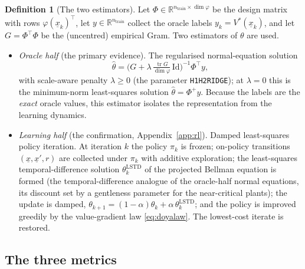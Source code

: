 \documentclass[11pt]{article}
\renewcommand{\_}{\discretionary{\textunderscore}{}{\textunderscore}}
\theoremstyle{plain}
\theoremstyle{definition}
\newtheorem{definition}[theorem]{Definition}
\newcommand{\R}{\mathbb{R}}
\newcommand{\tr}{\operatorname{tr}}
\begin{document}
\begin{definition}[The two estimators]\label{def:estimator}
Let $\Phi\in\R^{n_{\text{train}}\times\dim\varphi}$ be the design matrix with rows
$\varphi(\underline x_{k})^{\top}$, let $y\in\R^{n_{\text{train}}}$ collect the oracle labels
$y_{k}=V^{\ast}(\underline x_{k})$, and let $G=\Phi^{\top}\Phi$ be the (uncentred) empirical Gram. Two
estimators of $\theta$ are used.
\begin{itemize}
\item \emph{Oracle half} (the primary evidence). The regularised normal-equation solution
\[
\hat\theta=\Big(G+\lambda\,\tfrac{\tr G}{\dim\varphi}\,\mathrm{Id}\Big)^{-1}\Phi^{\top}y,
\]
with scale-aware penalty $\lambda\ge0$ (the parameter \texttt{H1H2\_RIDGE}); at $\lambda=0$ this is
the minimum-norm least-squares solution $\hat\theta=\Phi^{+}y$. Because the labels are the
\emph{exact} oracle values, this estimator isolates the representation from the learning dynamics.
\item \emph{Learning half} (the confirmation, Appendix~\ref{app:rl}). Damped least-squares policy
iteration. At iteration $k$ the policy $\pi_{k}$ is frozen; on-policy transitions
$(\underline x,\underline x',r)$ are collected under $\pi_{k}$ with additive exploration; the
least-squares temporal-difference solution $\theta^{\mathrm{LSTD}}_{k}$ of the projected Bellman
equation is formed (the temporal-difference analogue of the oracle-half normal equations, its
discount set by a gentleness parameter for the near-critical plants); the update is damped,
$\theta_{k+1}=(1-\alpha)\theta_{k}+\alpha\,\theta^{\mathrm{LSTD}}_{k}$; and the policy is improved
greedily by the value-gradient law \eqref{eq:doyalaw}. The lowest-cost iterate is restored.
\end{itemize}
\end{definition}

\subsection{The three metrics}\label{sec:metrics}
\end{document}
